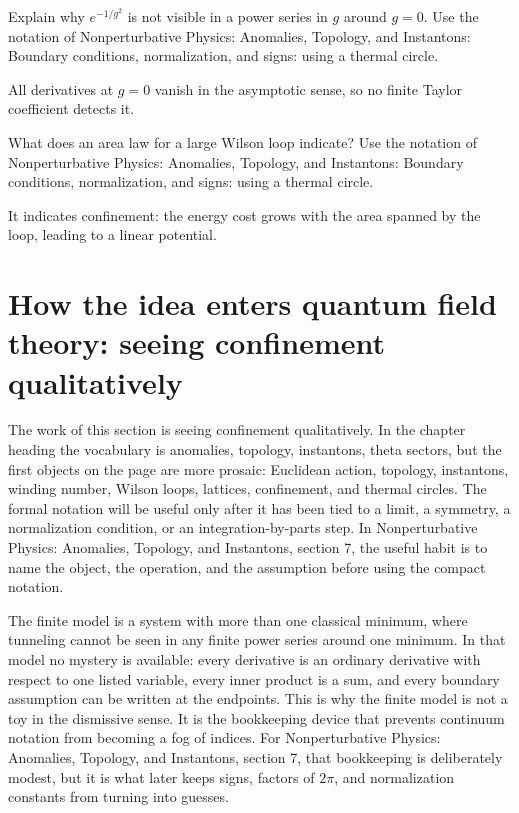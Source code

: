 \begin{exercise}
Explain why \(e^{-1/g^2}\) is not visible in a power series in \(g\) around \(g=0\).  Use the notation of Nonperturbative Physics: Anomalies, Topology, and Instantons: Boundary conditions, normalization, and signs: using a thermal circle.
\begin{answer}
All derivatives at \(g=0\) vanish in the asymptotic sense, so no finite Taylor coefficient detects it.
\end{answer}
\end{exercise}

\begin{exercise}
What does an area law for a large Wilson loop indicate?  Use the notation of Nonperturbative Physics: Anomalies, Topology, and Instantons: Boundary conditions, normalization, and signs: using a thermal circle.
\begin{answer}
It indicates confinement: the energy cost grows with the area spanned by the loop, leading to a linear potential.
\end{answer}
\end{exercise}



\section{How the idea enters quantum field theory: seeing confinement qualitatively}

The work of this section is seeing confinement qualitatively.  In the chapter heading the vocabulary is anomalies, topology, instantons, theta sectors, but the first objects on the page are more prosaic: Euclidean action, topology, instantons, winding number, Wilson loops, lattices, confinement, and thermal circles.  The formal notation will be useful only after it has been tied to a limit, a symmetry, a normalization condition, or an integration-by-parts step.  In Nonperturbative Physics: Anomalies, Topology, and Instantons, section 7, the useful habit is to name the object, the operation, and the assumption before using the compact notation.

The finite model is a system with more than one classical minimum, where tunneling cannot be seen in any finite power series around one minimum.  In that model no mystery is available: every derivative is an ordinary derivative with respect to one listed variable, every inner product is a sum, and every boundary assumption can be written at the endpoints.  This is why the finite model is not a toy in the dismissive sense.  It is the bookkeeping device that prevents continuum notation from becoming a fog of indices.  For Nonperturbative Physics: Anomalies, Topology, and Instantons, section 7, that bookkeeping is deliberately modest, but it is what later keeps signs, factors of \(2\pi\), and normalization constants from turning into guesses.

